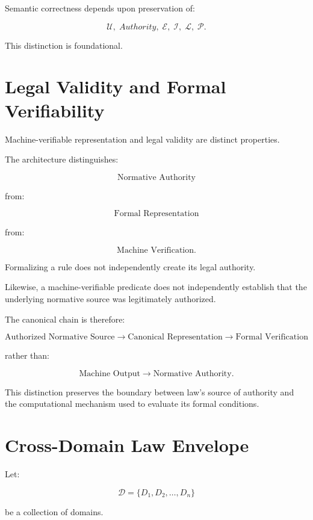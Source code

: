 \documentclass[11pt]{article}
\newcommand{\Purpose}{\mathcal{U}}
\newcommand{\Evidence}{\mathcal{E}}
\newcommand{\Inv}{\mathcal{I}}
\newcommand{\Law}{\mathcal{L}}
\newcommand{\Prov}{\mathcal{P}}
\newcommand{\Domain}{\mathcal{D}}
\begin{document}
Semantic correctness depends upon preservation of:

\[
\Purpose,\;
Authority,\;
\Evidence,\;
\Inv,\;
\Law,\;
\Prov.
\]

This distinction is foundational.

\section{Legal Validity and Formal Verifiability}

Machine-verifiable representation and legal validity are distinct
properties.

The architecture distinguishes:

\[
\boxed{
\text{Normative Authority}
}
\]

from:

\[
\boxed{
\text{Formal Representation}
}
\]

from:

\[
\boxed{
\text{Machine Verification}.
}
\]

Formalizing a rule does not independently create its legal
authority.

Likewise, a machine-verifiable predicate does not independently
establish that the underlying normative source was legitimately
authorized.

The canonical chain is therefore:

\[
\boxed{
\text{Authorized Normative Source}
\rightarrow
\text{Canonical Representation}
\rightarrow
\text{Formal Verification}
}
\]

rather than:

\[
\text{Machine Output}
\rightarrow
\text{Normative Authority}.
\]

This distinction preserves the boundary between law's source of
authority and the computational mechanism used to evaluate its
formal conditions.

\section{Cross-Domain Law Envelope}

Let:

\[
\Domain=\{D_1,D_2,\ldots,D_n\}
\]

be a collection of domains.
\end{document}
